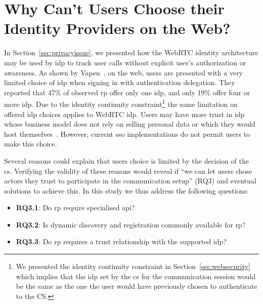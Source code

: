 \section{Why Can't Users Choose their Identity Providers on the Web?}
\label{userschooseidp}
In Section~\ref{sec:privacyissue}, we presented how the WebRTC identity architecture may be used by \gls{idp} to track user calls without explicit user's authorization or awareness. 
As shown by Vapen~\etal\cite{DBLP:conf/sec/VapenCMS15}, on the web, users are presented with a very limited choice of \gls{idp} when signing in with authentication delegation.
They reported that 47\% of observed \gls{rp} offer only one \gls{idp}, and only 19\% offer four or more \gls{idp}.
Due to the identity continuity constraint\footnote{We presented the identity continuity constraint in Section~\ref{sec:websecurity} which implies that the \gls{idp} set by the \gls{cs} for the communication session would be the same as the one the user would have previously chosen to authenticate to the CS.} the same limitation on offered \gls{idp} choices applies to WebRTC \gls{idp}.
Users may have more trust in \gls{idp} whose business model does not rely on selling personal data or which they would host themselves~\cite{sporny2011webid}.
However, current \gls{sso} implementations do not permit users to make this choice.

Several reasons could explain that users choice is limited by the decision of the \gls{cs}.
Verifying the validity of these reasons would reveal if ``we can let users chose actors they trust to participate in the communication setup'' (RQ3) and eventual solutions to achieve this.
In this study we thus address the following questions:
\begin{itemize}
\item \textbf{RQ3.1}: Do \gls{rp} require specialised \gls{api}?
\item \textbf{RQ3.2}: Is dynamic discovery and registration commonly available for \gls{rp}?
\item \textbf{RQ3.3}: Do \gls{rp} requires a trust relationship with the supported \gls{idp}?
\end{itemize}


